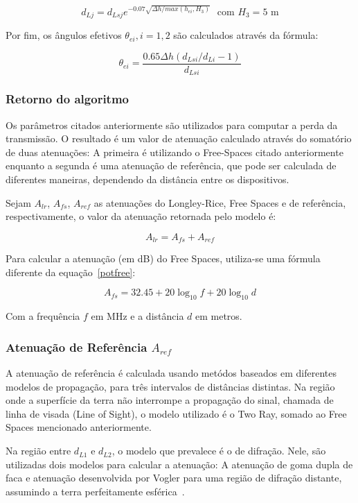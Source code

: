 \[
d_{Lj} = d_{Lsj}e^{-0.07\sqrt{\Delta h / max(h_{ei},H_3)}} \,\,\,\, \text{com $H_3 = 5$ m}
\]

Por fim, os ângulos efetivos $\theta_{ei}, i=1,2$ são calculados através da fórmula:

\[
	\theta_{ei} = \frac{0.65\Delta h(d_{Lsi}/d_{Li} -1)}{d_{Lsi}}
\]


\subsubsection{Retorno do algoritmo}

Os parâmetros citados anteriormente são utilizados para computar a perda da transmissão. O resultado é um valor de atenuação calculado através do somatório de duas atenuações: A primeira é utilizando o Free-Spaces citado anteriormente enquanto a segunda é uma atenuação de referência, que pode ser calculada de diferentes maneiras, dependendo da distância entre os dispositivos.

Sejam $A_{lr}$, $A_{fs}$, $A_{ref}$ as atenuações do Longley-Rice, Free Spaces e de referência, respectivamente, o valor da atenuação retornada pelo modelo é:

\[
A_{lr} = A_{fs} + A_{ref}
\]

Para calcular a atenuação (em dB) do Free Spaces, utiliza-se uma fórmula diferente da equação~\ref{potfree}:

\[
A_{fs} = 32.45 + 20 \log_{10}f + 20 \log_{10}d 
\]

Com a frequência $f$ em MHz e a distância $d$ em metros.

\subsubsection{Atenuação de Referência $A_{ref}$}

A atenuação de referência é calculada usando metódos baseados em diferentes modelos de propagação, para três intervalos de distâncias distintas. Na região onde a superfície da terra não interrompe a propagação do sinal, chamada de linha de visada (Line of Sight), o modelo utilizado é o Two Ray, somado ao Free Spaces mencionado anteriormente.

Na região entre $d_{L1}$ e $d_{L2}$, o modelo que prevalece é o de difração\cite{rufford}. Nele, são utilizadas dois modelos para calcular a atenuação: A atenuação de goma dupla de faca e atenuação desenvolvida por Vogler para uma região de difração distante, assumindo a terra perfeitamente esférica~\cite{vogler}.


